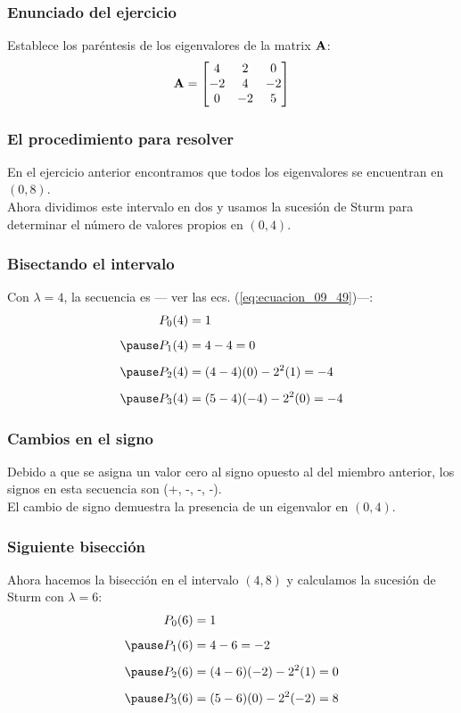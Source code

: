 \documentclass[12pt]{beamer}
\begin{document}
\begin{frame}
\frametitle{Enunciado del ejercicio}
Establece los paréntesis de los eigenvalores de la matrix $\vb{A}$:
\begin{align*}
\vb{A} = 
\begin{bmatrix}
4 & 2 & 0 \\
-2 & 4 & -2 \\
0 & -2 & 5
\end{bmatrix}
\end{align*}
\end{frame}
\begin{frame}
\frametitle{El procedimiento para resolver}
En el ejercicio anterior encontramos que todos los eigenvalores se encuentran en $(0, 8)$.
\\
\bigskip
\pause
Ahora dividimos este intervalo en dos y usamos la sucesión de Sturm para determinar el número de valores propios en $(0, 4)$.
\end{frame}
\begin{frame}
\frametitle{Bisectando el intervalo}
Con $\lambda = 4$, la secuencia es — ver las ecs. (\ref{eq:ecuacion_09_49})—:
\pause
\begin{eqnarray*}
\begin{aligned}
P_{0} (4) &= 1 \\[0.5em] \pause
P_{1} (4) &= 4 - 4 = 0 \\[0.5em] \pause
P_{2} (4) &= (4 - 4)(0) - 2^{2} (1) = -4 \\[0.5em] \pause
P_{3} (4) &= (5 - 4)(-4) - 2^{2} (0) = -4
\end{aligned}
\end{eqnarray*}
\end{frame}
\begin{frame}
\frametitle{Cambios en el signo}
Debido a que se asigna un valor cero al signo opuesto al del miembro anterior, \pause los signos en esta secuencia son (+, -, -, -).
\\
\bigskip
\pause
El cambio de signo demuestra la presencia de un eigenvalor en $(0, 4)$.
\end{frame}
\begin{frame}
\frametitle{Siguiente bisección}
Ahora hacemos la bisección en el intervalo $(4, 8)$ y calculamos la sucesión de Sturm con $\lambda = 6$:
\pause
\begin{eqnarray*}
\begin{aligned}
P_{0} (6) &= 1 \\[0.5em] \pause
P_{1} (6) &= 4 - 6 = -2 \\[0.5em] \pause
P_{2} (6) &= (4 - 6)(-2) - 2^{2} (1) = 0 \\[0.5em] \pause
P_{3} (6) &= (5 - 6)(0) - 2^{2} (-2) = 8
\end{aligned}
\end{eqnarray*}    
\end{frame}
\end{document}
